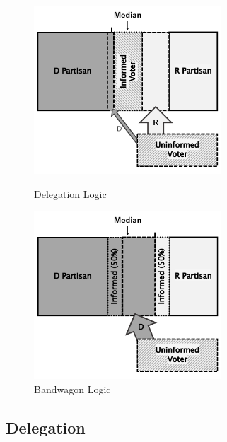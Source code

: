 \documentclass[doc,natbib,12pt]{apa6}\usepackage[]{graphicx}\usepackage[]{color}
\begin{document}
    \begin{figure}[t!!]
        \begin{minipage}{0.5\hsize}
            \begin{center}
                \includegraphics[width=70mm]{pictures/delegation_paper.png}
            \end{center}
            \caption{Delegation Logic}
            \label{delegation}
        \end{minipage}
        \begin{minipage}{0.5\hsize}
            \begin{center}
                \includegraphics[width=70mm]{pictures/bandwagon_paper.png}
            \end{center}
            \caption{Bandwagon Logic}
            \label{bandwagon}
        \end{minipage}
    \end{figure}
    
    \subsection{Delegation}
    
\end{document}
